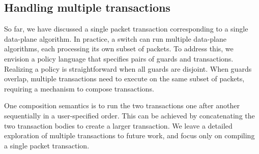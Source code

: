 
\subsection{Handling multiple transactions}
\label{ss:multiple}
So far, we have discussed a single packet transaction corresponding to a single
data-plane algorithm. In practice, a switch can run multiple data-plane
algorithms, each processing its own subset of packets. To address this, we
envision a policy language that specifies pairs of guards and transactions.
Realizing a policy is straightforward when all guards are disjoint. When guards
overlap, multiple transactions need to execute on the same subset of packets,
requiring a mechanism to compose transactions.

One composition semantics is to run the two transactions one after another
sequentially in a user-specified order. This can be achieved by concatenating
the two transaction bodies to create a larger transaction.  We leave a detailed
exploration of multiple transactions to future work, and focus only on
compiling a single packet transaction.

